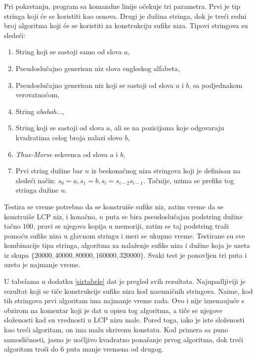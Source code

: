 
Pri pokretanju, program sa komandne linije o\v cekuje tri parametra. Prvi je tip stringa koji \' ce se koristiti kao osnova. Drugi je du\v zina stringa, dok je tre\' ci redni broj algoritma koji \' ce se koristiti za konstrukciju sufiks niza. Tipovi stringova su slede\' ci:

\begin{enumerate}
    \item String koji se sastoji samo od slova $a$,
    \item Pseudoslu\v cajno generisan niz slova engleskog alfabeta,
    \item Pseudoslu\v cajno generisan niz koji se sastoji od slova $a$ i $b$, sa podjednakom verovatno\' com,
    \item String $ababab\ldots$,
    \item String koji se sastoji od slova $a$, ali se na pozicijama koje odgovaraju kvadratima celog broja nalazi slovo $b$,
    \item \textit{Thue-Morse} sekvenca \cite{thuemorse} od slova $a$ i $b$,
    \item Prvi string du\v zine bar $n$ iz beskona\v cnog niza stringova koji je definisan na slede\' ci na\v cin: $s_0 = a, s_1 = b, s_i = s_{i-2}s_{i-1}$. Ta\v cnije, uzima se prefiks tog stringa du\v zine $n$.
\end{enumerate}

Testira se vreme potrebno da se konstrui\v se sufiks niz, zatim vreme da se konstrui\v se LCP niz, i kona\v cno, $n$ puta se bira pseudoslu\v cajan podstring du\v zine ta\v cno $100$, pravi se njegova kopija u memoriji, zatim se taj podstring tra\v zi pomo\' cu sufiks niza u glavnom stringu i meri se ukupno vreme. Testirane su sve kombinacije tipa stringa, algoritma za nala\v zenje sufiks niza i du\v zine koja je uzeta iz skupa $\{20000, 40000, 80000, 160000, 320000\}$. Svaki test je ponovljen tri puta i uzeto je najmanje vreme.


U tabelama u dodatku \ref{sirtabele} dat je pregled svih rezultata. Najupadljiviji je rezultat koji se ti\v ce konstrukcije sufiks niza kod nasumi\v cnih stringova. Naime, kod tih stringova prvi algoritam ima najmanje vreme rada. Ovo i nije iznena\dj uju\' ce s obzirom na komentar koji je dat u opisu tog algoritma, a ti\v ce se njegove slo\v zenosti kad su vrednosti u LCP nizu male. Pored toga, iako je iste slo\v zenosti kao tre\' ci algoritam, on ima malu skrivenu konstatu. Kod primera sa puno samosli\v cnosti, jasno je uo\v cljivo kvadratno pona\v sanje prvog algoritma, dok tre\' ci algoritam tro\v si do $6$ puta manje vremena od drugog.

